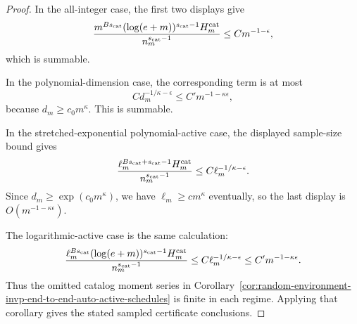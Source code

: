 \documentclass[11pt]{amsart}
\numberwithin{equation}{section}
\theoremstyle{definition}
\theoremstyle{remark}
\begin{document}
\begin{proof}
In the all-integer case, the first two displays give
\[
  \frac{m^{Bs_{\rm cat}}(\log(e+m))^{s_{\rm cat}-1}H_m^{\rm cat}}
       {n_m^{s_{\rm cat}-1}}
  \le C m^{-1-\epsilon},
\]
which is summable.

In the polynomial-dimension case, the corresponding term is at most
\[
  C d_m^{-1/\kappa-\epsilon}
  \le C' m^{-1-\kappa\epsilon},
\]
because \(d_m\ge c_0m^\kappa\).  This is summable.

In the stretched-exponential polynomial-active case, the displayed sample-size
bound gives
\[
  \frac{\ell_m^{Bs_{\rm cat}+s_{\rm cat}-1}H_m^{\rm cat}}
       {n_m^{s_{\rm cat}-1}}
  \le C\ell_m^{-1/\kappa-\epsilon}.
\]
Since \(d_m\ge\exp(c_0m^\kappa)\), we have \(\ell_m\ge c m^\kappa\) eventually,
so the last display is \(O(m^{-1-\kappa\epsilon})\).

The logarithmic-active case is the same calculation:
\[
  \frac{\ell_m^{Bs_{\rm cat}}(\log(e+m))^{s_{\rm cat}-1}H_m^{\rm cat}}
       {n_m^{s_{\rm cat}-1}}
  \le C\ell_m^{-1/\kappa-\epsilon}
  \le C' m^{-1-\kappa\epsilon}.
\]
Thus the omitted catalog moment series in
Corollary~\ref{cor:random-environment-invp-end-to-end-auto-active-schedules}
is finite in each regime.  Applying that corollary gives the stated sampled
certificate conclusions.
\end{proof}
\end{document}
